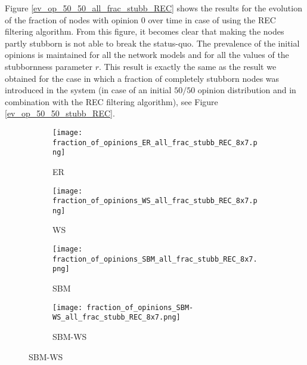 \documentclass[11 pt , letterpaper , twoside , openright]{book}
\begin{document}
\newline
Figure \ref{ev_op_50_50_all_frac_stubb_REC} shows the results for the evolution of the fraction of nodes with opinion 0 over time in case of using the REC filtering algorithm. From this figure, it becomes clear that making the nodes partly stubborn is not able to break the status-quo. The prevalence of the initial opinions is maintained for all the network models and for all the values of the stubbornness parameter $r$. This result is exactly the same as the result we obtained for the case in which a fraction of completely stubborn nodes was introduced in the system (in case of an initial $50/50$ opinion distribution and in combination with the REC filtering algorithm), see Figure \ref{ev_op_50_50_stubb_REC}.

\begin{figure}[H]
  \begin{subfigure}[b]{0.49\textwidth}
  	\texttt{[image: fraction\_of\_opinions\_ER\_all\_frac\_stubb\_REC\_8x7.png]}
    \caption{ER}
  \end{subfigure}
  \begin{subfigure}[b]{0.49\textwidth}
  	\texttt{[image: fraction\_of\_opinions\_WS\_all\_frac\_stubb\_REC\_8x7.png]}
    \caption{WS}
  \end{subfigure}
  \begin{subfigure}[b]{0.49\textwidth}
    \texttt{[image: fraction\_of\_opinions\_SBM\_all\_frac\_stubb\_REC\_8x7.png]}
    \caption{SBM}
  \end{subfigure}
  \begin{subfigure}[b]{0.49\textwidth}
    \texttt{[image: fraction\_of\_opinions\_SBM-WS\_all\_frac\_stubb\_REC\_8x7.png]}
    \caption{SBM-WS}
  \end{subfigure}
  \captionsetup{format=plain}

\end{figure}
\end{document}
